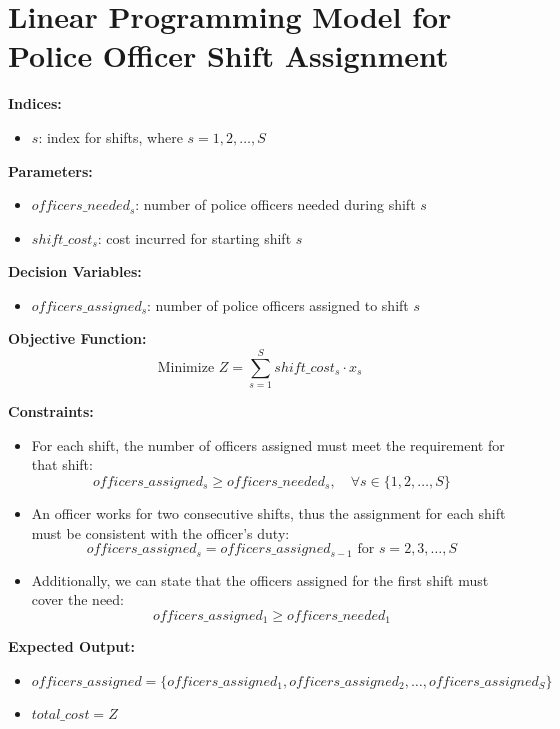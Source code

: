 \documentclass{article}
\begin{document}
\section*{Linear Programming Model for Police Officer Shift Assignment}

\textbf{Indices:}
\begin{itemize}
    \item $s$: index for shifts, where $s = 1, 2, \ldots, S$
\end{itemize}

\textbf{Parameters:}
\begin{itemize}
    \item $officers\_needed_s$: number of police officers needed during shift $s$
    \item $shift\_cost_s$: cost incurred for starting shift $s$
\end{itemize}

\textbf{Decision Variables:}
\begin{itemize}
    \item $officers\_assigned_s$: number of police officers assigned to shift $s$
\end{itemize}

\textbf{Objective Function:}
\begin{equation}
\text{Minimize } Z = \sum_{s=1}^{S} shift\_cost_s \cdot x_s
\end{equation}

\textbf{Constraints:}
\begin{itemize}
    \item For each shift, the number of officers assigned must meet the requirement for that shift:
    \begin{equation}
    officers\_assigned_s \geq officers\_needed_s, \quad \forall s \in \{1, 2, \ldots, S\}
    \end{equation}
    
    \item An officer works for two consecutive shifts, thus the assignment for each shift must be consistent with the officer's duty:
    \begin{equation}
    officers\_assigned_s = officers\_assigned_{s-1} \text{ for } s=2,3,\ldots,S
    \end{equation}
    
    \item Additionally, we can state that the officers assigned for the first shift must cover the need:
    \begin{equation}
    officers\_assigned_1 \geq officers\_needed_1
    \end{equation}
\end{itemize}

\textbf{Expected Output:}
\begin{itemize}
    \item $officers\_assigned = \{officers\_assigned_1, officers\_assigned_2, \ldots, officers\_assigned_S\}$
    \item $total\_cost = Z$
\end{itemize}
\end{document}
